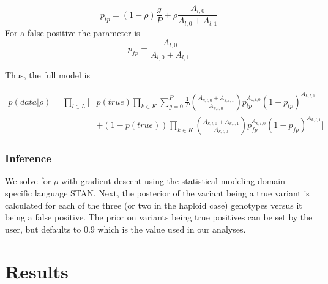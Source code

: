 \begin{equation}
p_{tp} = (1-\rho)\frac{g}{P} + \rho \frac{A_{l,0}}{A_{l,0}+A_{l,1}}
\end{equation}
For a false positive the parameter is
\begin{equation}
p_{fp} = \frac{A_{l,0}}{A_{l,0} + A_{l,1}}
\end{equation}

Thus, the full model is


\begin{equation}
\begin{split}
p(data | \rho) = \prod_{l \in L} \bigg[ & p(true) \prod_{k \in K} \sum_{g = 0}^P \frac{1}{P} \binom{A_{k,l,0} + A_{k,l,1}}{A_{k,l,0}} p_{tp}^{A_{k,l,0}} (1-p_{tp})^{A_{k,l,1}} \\
 & + (1-p(true))\prod_{k \in K}\binom{A_{k,l,0} + A_{k,l,1}}{A_{k,l,0}}p_{fp}^{A_{k,l,0}} (1-p_{fp})^{A_{k,l,1}}  \bigg]
\end{split}
\end{equation}

\subsubsection{Inference}
We solve for $\rho$ with gradient descent using the statistical modeling domain specific language STAN. Next, the posterior of the variant being a true variant is calculated for each of the three (or two in the haploid case) genotypes versus it being a false positive. The prior on variants being true positives can be set by the user, but defaults to 0.9 which is the value used in our analyses.




\section{Results}



